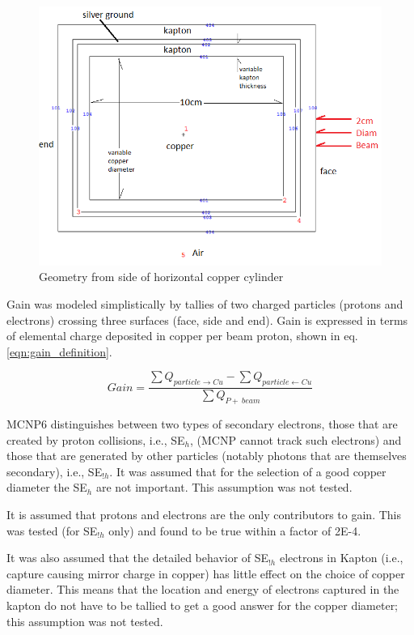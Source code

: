 \documentclass{mc2015}
\begin{document}
\begin{figure}[H]
  \centering
  \includegraphics[width=5in]{figures/fig_geometry.png}
  \caption{Geometry from side of horizontal copper cylinder}
  \label{fig:model_geometry}
\end{figure}

Gain was modeled simplistically by tallies of two charged particles (protons and electrons) crossing three surfaces (face, side and end). Gain is expressed in terms of elemental charge deposited in copper per beam proton, shown in eq. \ref{eqn:gain_definition}.

\begin{equation}
Gain = \frac{\sum Q_{particle\rightarrow Cu} - \sum Q_{particle\leftarrow Cu}}{\sum Q_{P+\ beam}}
\label{eqn:gain_definition}
\end{equation}

MCNP6 distinguishes between two types of secondary electrons, those that are created by proton collisions, i.e., SE$_h$, (MCNP cannot track such electrons) and those that are generated by other particles (notably photons that are themselves secondary), i.e., SE$_{!h}$. It was assumed that for the selection of a good copper diameter the SE$_h$ are not important. This assumption was not tested.

It is assumed that protons and electrons are the only contributors to gain. This was tested (for SE$_{!h}$ only) and found to be true within a factor of 2E-4.

It was also assumed that the detailed behavior of SE$_{!h}$ electrons in Kapton (i.e., capture causing mirror charge in copper) has little effect on the choice of copper diameter. This means that the location and energy of electrons captured in the kapton do not have to be tallied to get a good answer for the copper diameter; this assumption was not tested.
\end{document}
